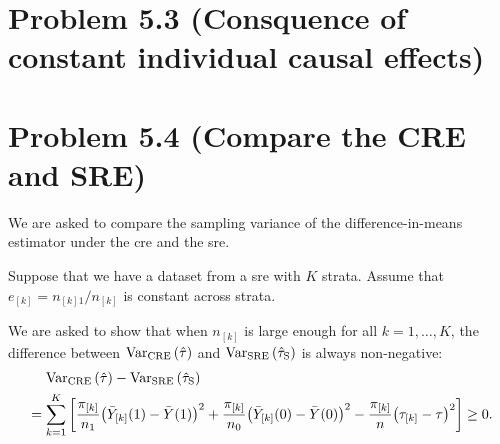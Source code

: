 \documentclass[10pt]{article}
\begin{document}
\section*{Problem 5.3 (Consquence of constant individual causal effects)}

\section*{Problem 5.4 (Compare the CRE and SRE)}

We are asked to compare the sampling variance of the difference-in-means estimator
under the \gls{cre} and the \gls{sre}.

Suppose that we have a dataset from a \gls{sre} with $K$ strata.
Assume that $e_{[k]} = n_{[k]1}/n_{[k]}$ is constant across strata.

We are asked to show that
when $n_{[k]}$ is large enough for all $k = 1, \ldots, K$,
the difference between $\operatorname{Var}_{\text{CRE}}{\left( \hat{\tau} \right)}$ 
and $\operatorname{Var}_{\text{SRE}}{\left( \hat{\tau}_\text{S} \right)}$
is always non-negative:
\begin{align*}
  &\mathrel{\phantom{=}} \operatorname{Var}_{\text{CRE}}{\left( \hat{\tau} \right)} - \operatorname{Var}_{\text{SRE}}{\left( \hat{\tau}_\text{S} \right)} \\
  &= \sum_{k=1}^K {\left[ 
    \frac{\pi_{[k]}}{n_1} {\left( \bar{Y}_{[k]}(1) - \bar{Y}(1) \right)}^2 
    + \frac{\pi_{[k]}}{n_0} {\left( \bar{Y}_{[k]}(0) - \bar{Y}(0) \right)}^2
    - \frac{\pi_{[k]}}{n} {\left( \tau_{[k]} - \tau \right)}^2
   \right]} \geq 0.
\end{align*}
\end{document}
